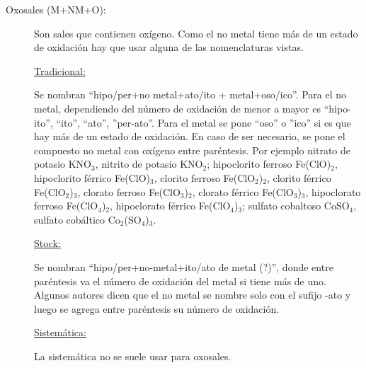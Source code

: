 \begin{description}
\item[Oxosales (M+NM+O):]\hfill

Son sales que contienen oxígeno. Como el no metal tiene más de un estado de oxidación hay que usar alguna de las nomenclaturas vistas.

    \underline{Tradicional:}
    
    Se nombran ``hipo/per+no metal+ato/ito + metal+oso/ico''. Para el no metal, dependiendo del número de oxidación de menor a mayor es ``hipo-ito'', ``ito'', ``ato'', ''per-ato''. Para el metal se pone ``oso'' o ''ico'' si es que hay más de un estado de oxidación. En caso de ser necesario, se pone el compuesto no metal con oxígeno entre paréntesis. Por ejemplo nitrato de potasio KNO$_3$, nitrito de potasio KNO$_2$; hipoclorito ferroso Fe(ClO)$_2$, hipoclorito férrico Fe(ClO)$_3$, clorito ferroso Fe(ClO$_2$)$_2$, clorito férrico Fe(ClO$_2$)$_3$, clorato ferroso Fe(ClO$_3$)$_2$, clorato férrico Fe(ClO$_3$)$_3$, hipoclorato ferroso Fe(ClO$_4$)$_2$, hipoclorato férrico Fe(ClO$_4$)$_3$; sulfato cobaltoso CoSO$_4$, sulfato cobáltico Co$_2$(SO$_4$)$_3$.
    
    \underline{Stock:}
    
    Se nombran ``hipo/per+no-metal+ito/ato de metal (?)'', donde entre paréntesis va el número de oxidación del metal si tiene más de uno. Algunos autores dicen que el no metal se nombre solo con el sufijo -ato y luego se agrega entre paréntesis su número de oxidación.
    
    \underline{Sistemática:}
    
    La sistemática no se suele usar para oxosales.

\end{description}

